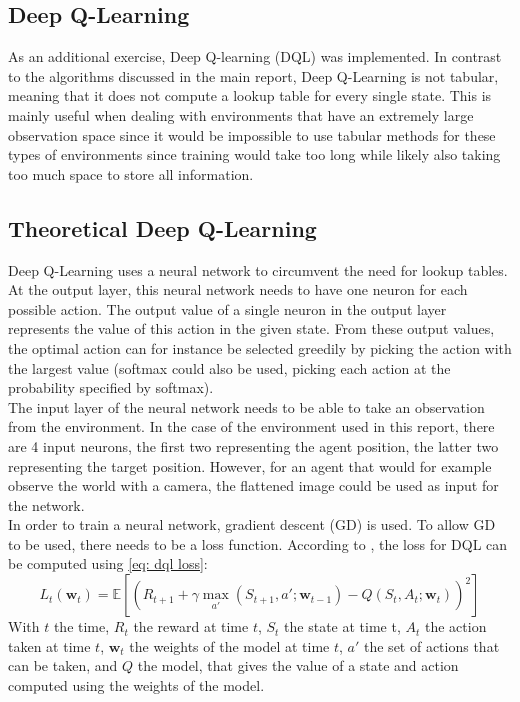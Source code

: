 \documentclass{class}
\begin{document}
\begin{appendices}

\section{Deep Q-Learning}
\label{app: deep q-learning}
As an additional exercise, Deep Q-learning (DQL) was implemented. In contrast to the algorithms discussed in the main report, Deep Q-Learning is not tabular, meaning that it does not compute a lookup table for every single state. This is mainly useful when dealing with environments that have an extremely large observation space since it would be impossible to use tabular methods for these types of environments since training would take too long while likely also taking too much space to store all information.

\subsection{Theoretical Deep Q-Learning}
Deep Q-Learning uses a neural network to circumvent the need for lookup tables. At the output layer, this neural network needs to have one neuron for each possible action. The output value of a single neuron in the output layer represents the value of this action in the given state. From these output values, the optimal action can for instance be selected greedily by picking the action with the largest value (softmax could also be used, picking each action at the probability specified by softmax). 
\\[0.3cm]
The input layer of the neural network needs to be able to take an observation from the environment. In the case of the environment used in this report, there are 4 input neurons, the first two representing the agent position, the latter two representing the target position. However, for an agent that would for example observe the world with a camera, the flattened image could be used as input for the network.
\\[0.3cm]
In order to train a neural network, gradient descent (GD) is used. To allow GD to be used, there needs to be a loss function. According to \textcite{lecture6}, the loss for DQL can be computed using \autoref{eq: dql loss}:
\begin{equation}
    \label{eq: dql loss}
    L_t(\mathbf{w}_t) = \mathbb{E}\left[\left(R_{t+1} + \gamma\max_{a'}(S_{t+1}, a';\mathbf{w}_{t-1}) - Q(S_t, A_t;\mathbf{w}_t)\right)^2\right]
\end{equation}
With $t$ the time, $R_t$ the reward at time $t$, $S_t$ the state at time t, $A_t$ the action taken at time $t$, $\mathbf{w}_t$ the weights of the model at time $t$, $a'$ the set of actions that can be taken, and $Q$ the model, that gives the value of a state and action computed using the weights of the model.


\end{appendices}
\end{document}
